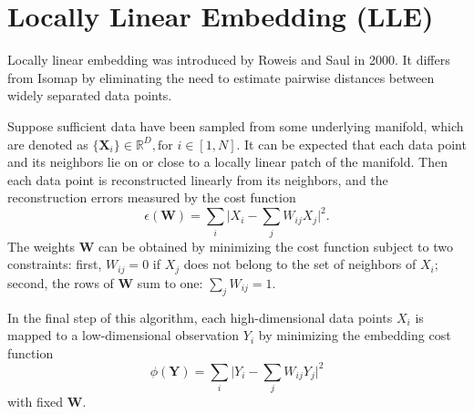 \section{Locally Linear Embedding (LLE)\label{Sec:DR:LLE}}
Locally linear embedding was introduced by Roweis and Saul in 2000.\cite{RoweisScience2000} It differs from Isomap by eliminating the need to estimate pairwise distances between widely separated data points.

Suppose sufficient data have been sampled from some underlying manifold, which are denoted as $\{\mathbf{X}_i\}\in \mathbb{R}^D, \text{for }i\in [1,N]$. It can be expected that each data point and its neighbors lie on or close to a locally linear patch of the manifold. Then each data point is reconstructed linearly from its neighbors, and the reconstruction errors measured by the cost function
\begin{equation}
	\epsilon(\mathbf{W})=\sum_i\vert X_i-\sum_j W_{ij}X_j\vert^2.
\end{equation}
The weights $\mathbf{W}$ can be obtained by minimizing the cost function subject to two constraints: first, $W_{ij}=0$ if $X_j$ does not belong to the set of neighbors of $X_i$; second, the rows of $\mathbf{W}$ sum to one: $\sum_j W_{ij}=1$.

In the final step of this algorithm, each high-dimensional data points $X_i$ is mapped to a low-dimensional observation $Y_i$ by minimizing the embedding cost function
\begin{equation}
	\phi(\mathbf{Y})=\sum_i \vert Y_i -\sum_j W_{ij}Y_j\vert ^2
\end{equation}
with fixed $\mathbf{W}$.